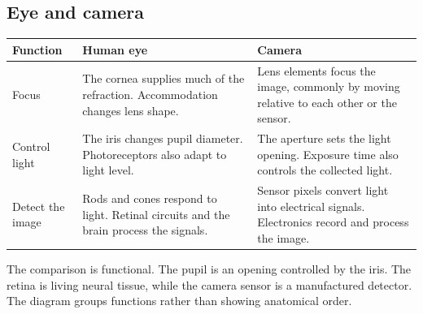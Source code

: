 \documentclass[12pt,a4paper]{article}
\begin{document}
\subsection{Eye and camera}
\begin{tcolorbox}[tikzbox, title={Two imaging chains}]
\centering
{}\par
\end{tcolorbox}

\par\vspace{5pt}
\begingroup
\setlength{\extrarowheight}{1pt}
\noindent\begin{tabularx}{\linewidth}{|B{3cm}|Y|Y|}
\hline
\textbf{Function} & \textbf{Human eye} & \textbf{Camera} \\ \hline
Focus & The cornea supplies much of the refraction. Accommodation changes lens shape. & Lens elements focus the image, commonly by moving relative to each other or the sensor. \\ \hline
Control light & The iris changes pupil diameter. Photoreceptors also adapt to light level. & The aperture sets the light opening. Exposure time also controls the collected light. \\ \hline
Detect the image & Rods and cones respond to light. Retinal circuits and the brain process the signals. & Sensor pixels convert light into electrical signals. Electronics record and process the image. \\ \hline
\end{tabularx}\par
\endgroup
\begin{tcolorbox}[masonbox, title={State the limits of the analogy}]
The comparison is functional. The pupil is an opening controlled by the iris. The retina is living neural tissue, while the camera sensor is a manufactured detector. The diagram groups functions rather than showing anatomical order.
\end{tcolorbox}
\end{document}
